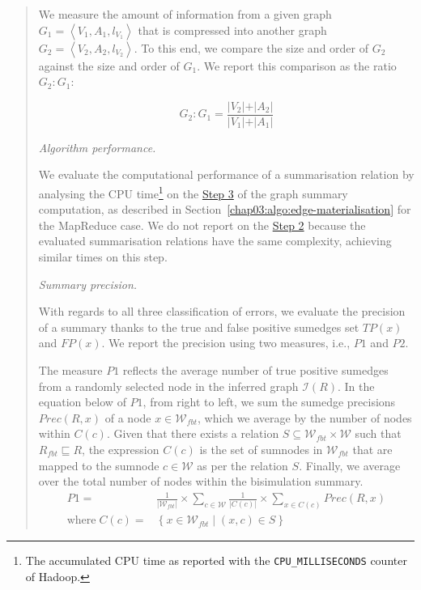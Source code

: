 \begin{quotation}
	We measure the amount of information from a given graph $G_1 = \left\langle V_1, A_1, l_{V_1} \right\rangle$ that is compressed into another graph $G_2 = \left\langle V_2, A_2, l_{V_2} \right\rangle$. To this end, we compare the size and order of $G_2$ against the size and order of $G_1$. We report this comparison as the ratio $G_2:G_1$:

	$$
	G_2:G_1 = \frac{\vert V_2 \vert + \vert A_2 \vert}{\vert V_1 \vert + \vert A_1 \vert}
	$$

	\item[\emph{Algorithm performance.}]

	We evaluate the computational performance of a summarisation relation by analysing the CPU time\footnote{The accumulated CPU time as reported with the \texttt{CPU\_MILLISECONDS} counter of Hadoop.} on the \hyperref[step-he]{Step 3} of the graph summary computation, as described in Section~\ref{chap03:algo:edge-materialisation} for the MapReduce case. We do not report on the \hyperref[step-hn]{Step 2} because the evaluated summarisation relations have the same complexity, achieving similar times on this step.

	\item[\emph{Summary precision.}]

	With regards to all three classification of errors, we evaluate the precision of a summary thanks to the true and false positive sumedges set $TP(x)$ and $FP(x)$.
	We report the precision using two measures, i.e., $P1$ and $P2$.

	The measure $P1$ reflects the average number of true positive sumedges from a randomly selected node in the inferred graph $\mathcal{I}(R)$. In the equation below of $P1$, from right to left, we sum the sumedge precisions $Prec(R, x)$ of a node $x\in \mathcal{W}_{fbt}$, which we average by the number of nodes within $C(c)$. Given that there exists a relation $S \subseteq \mathcal{W}_{fbt} \times \mathcal{W}$ such that $R_{fbt} \sqsubseteq R$, the expression $C(c)$ is the set of sumnodes in $\mathcal{W}_{fbt}$ that are mapped to the sumnode $c \in \mathcal{W}$ as per the relation $S$. Finally, we average over the total number of nodes within the bisimulation summary.
	$$
	\begin{aligned}
	P1 = & \frac{1}{\vert \mathcal{W}_{fbt} \vert} \times \sum_{c \in \mathcal{W}}{\frac{1}{\vert C(c) \vert} \times \sum_{x \in C(c)}{Prec(R, x)}} \\
	\text{where}\; C(c) = & \left\lbrace x \in \mathcal{W}_{fbt} \mid (x, c) \in S \right\rbrace
	\end{aligned}
	$$


\end{quotation}
